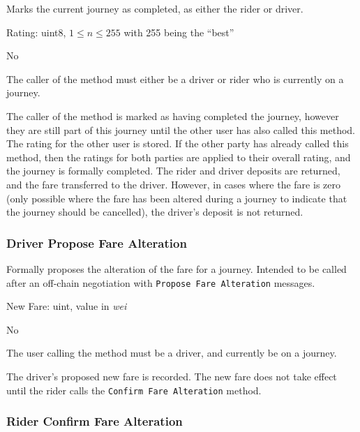 \begin{description}[leftmargin=8em,style=nextline]
	\item [Description]
		Marks the current journey as completed, as either the rider or driver.
	\item [Arguments]
		Rating: uint8, $1 \leq n \leq 255$ with 255 being the \enquote{best}
	\item [Payable] No
	\item [Preconditions]
		The caller of the method must either be a driver or rider who is currently on a journey.
	\item [Postconditions]
		The caller of the method is marked as having completed the journey, however they are still part of this journey until the other user has also called this method. The rating for the other user is stored. If the other party has already called this method, then the ratings for both parties are applied to their overall rating, and the journey is formally completed. The rider and driver deposits are returned, and the fare transferred to the driver. However, in cases where the fare is zero (only possible where the fare has been altered during a journey to indicate that the journey should be cancelled), the driver's deposit is not returned.
\end{description}

\subsubsection{Driver Propose Fare Alteration}

\begin{description}[leftmargin=8em,style=nextline]
	\item [Description]
		Formally proposes the alteration of the fare for a journey. Intended to be called after an off-chain negotiation with \lstinline{Propose Fare Alteration} messages.
	\item [Arguments]
		New Fare: uint, value in \textit{wei}
	\item [Payable]
		No
	\item [Preconditions]
		The user calling the method must be a driver, and currently be on a journey.
	\item [Postconditions]
		The driver's proposed new fare is recorded. The new fare does not take effect until the rider calls the \lstinline{Confirm Fare Alteration} method.
\end{description}

\subsubsection{Rider Confirm Fare Alteration}

